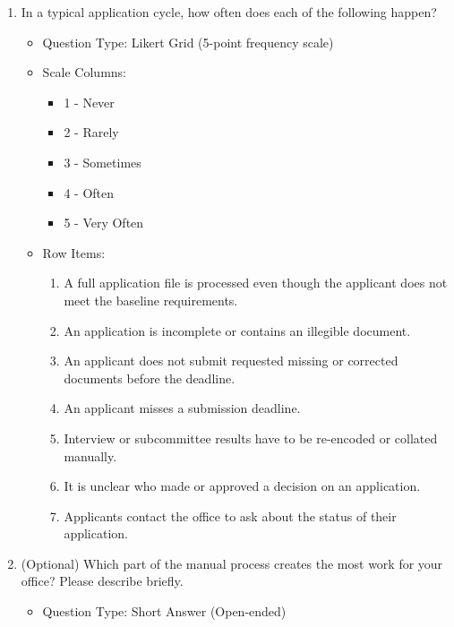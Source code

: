\begin{enumerate}[resume=q, label={Question \arabic*:}, leftmargin=*, align=left]
  \item In a typical application cycle, how often does each of the following happen?
  \begin{itemize}[leftmargin=*]
    \item Question Type: Likert Grid (5-point frequency scale)
    \item Scale Columns:
    \begin{itemize}[leftmargin=*]
      \item 1 - Never
      \item 2 - Rarely
      \item 3 - Sometimes
      \item 4 - Often
      \item 5 - Very Often
    \end{itemize}
    \item Row Items:
    \begin{enumerate}[label=\arabic*., leftmargin=*]
      \item A full application file is processed even though the applicant does not meet the baseline requirements.
      \item An application is incomplete or contains an illegible document.
      \item An applicant does not submit requested missing or corrected documents before the deadline.
      \item An applicant misses a submission deadline.
      \item Interview or subcommittee results have to be re-encoded or collated manually.
      \item It is unclear who made or approved a decision on an application.
      \item Applicants contact the office to ask about the status of their application.
    \end{enumerate}
  \end{itemize}
  \item (Optional) Which part of the manual process creates the most work for your office? Please describe briefly.
  \begin{itemize}[leftmargin=*]
    \item Question Type: Short Answer (Open-ended)
  \end{itemize}
\end{enumerate}
